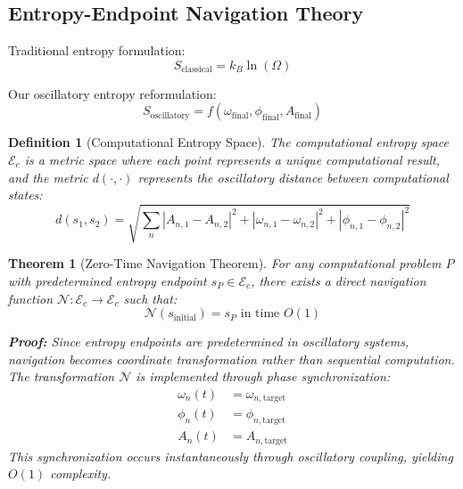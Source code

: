 \documentclass[12pt,a4paper]{article}
\newtheorem{theorem}{Theorem}
\newtheorem{definition}{Definition}
\begin{document}
\subsection{Entropy-Endpoint Navigation Theory}

Traditional entropy formulation:
\begin{equation}
S_{\text{classical}} = k_B \ln(\Omega)
\end{equation}

Our oscillatory entropy reformulation:
\begin{equation}
S_{\text{oscillatory}} = f(\omega_{\text{final}}, \phi_{\text{final}}, A_{\text{final}})
\end{equation}

\begin{definition}[Computational Entropy Space]
The computational entropy space $\mathcal{E}_c$ is a metric space where each point represents a unique computational result, and the metric $d(\cdot,\cdot)$ represents the oscillatory distance between computational states:
\begin{equation}
d(s_1, s_2) = \sqrt{\sum_{n} |A_{n,1} - A_{n,2}|^2 + |\omega_{n,1} - \omega_{n,2}|^2 + |\phi_{n,1} - \phi_{n,2}|^2}
\end{equation}
\end{definition}

\begin{theorem}[Zero-Time Navigation Theorem]
For any computational problem $P$ with predetermined entropy endpoint $s_P \in \mathcal{E}_c$, there exists a direct navigation function $\mathcal{N}: \mathcal{E}_c \rightarrow \mathcal{E}_c$ such that:
\begin{equation}
\mathcal{N}(s_{\text{initial}}) = s_P \text{ in time } O(1)
\end{equation}

\textbf{Proof:}
Since entropy endpoints are predetermined in oscillatory systems, navigation becomes coordinate transformation rather than sequential computation. The transformation $\mathcal{N}$ is implemented through phase synchronization:
\begin{align}
\omega_n(t) &= \omega_{n,\text{target}} \\
\phi_n(t) &= \phi_{n,\text{target}} \\
A_n(t) &= A_{n,\text{target}}
\end{align}
This synchronization occurs instantaneously through oscillatory coupling, yielding $O(1)$ complexity.
\end{theorem}
\end{document}
